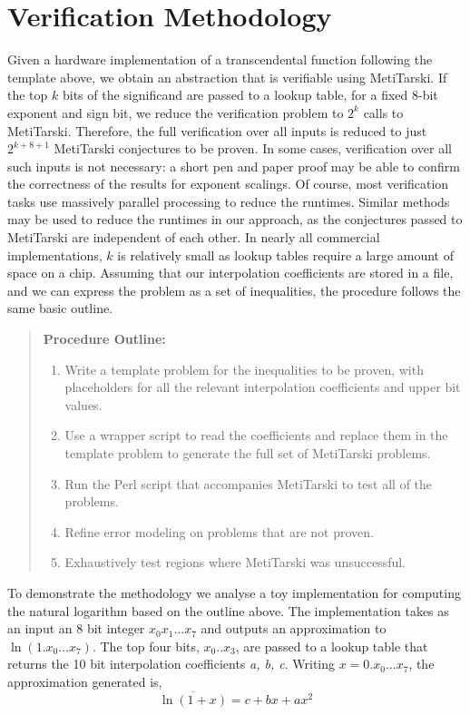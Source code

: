 \documentclass[a4]{article}
\begin{document}
\section{Verification Methodology}
Given a hardware implementation of a transcendental function following the template above, we obtain an abstraction that is verifiable using MetiTarski. If the top $k$ bits of the significand are passed to a lookup table, for a fixed 8-bit exponent and sign bit, we reduce the verification problem to $2^k$ calls to MetiTarski. Therefore, the  full verification over all inputs is reduced to 
just $2^{k+8+1}$ MetiTarski conjectures to be proven. In some cases, verification over all such inputs is not necessary: a short pen and paper proof may be able to confirm the correctness of the results for exponent scalings. Of course, most verification tasks use massively parallel processing to reduce the runtimes. Similar methods may be used to reduce the runtimes in our approach, as the conjectures passed to MetiTarski are independent of each other. In nearly all commercial implementations, $k$ is relatively small as lookup tables require a large amount of space on a chip. Assuming that our interpolation coefficients are stored in a file, and we can express the problem as a set of inequalities, the procedure follows the same basic outline.


\begin{quotation}
\textbf{Procedure Outline:}
\begin{enumerate}
\item Write a template problem for the inequalities to be proven, with placeholders for all the relevant interpolation coefficients and upper bit values.
\item Use a wrapper script to read the coefficients and replace them in the template problem to generate the full set of MetiTarski problems.
\item Run the Perl script that accompanies MetiTarski to test all of the problems.
\item Refine error modeling on problems that are not proven.
\item Exhaustively test regions where MetiTarski was unsuccessful.
\end{enumerate}  
\end{quotation}

To demonstrate the methodology we analyse a toy implementation for computing the natural logarithm based on the outline above. The implementation takes as an input an 8 bit integer $x_0x_1...x_7$ and outputs an approximation to $\ln(1.x_0...x_7)$. The top four bits, $x_0..x_3$, are passed to a lookup table that returns the 10 bit interpolation coefficients \textit{a, b, c}. Writing $x=0.x_0...x_7$, the approximation generated is,
$$ \overline{\ln(1+x)}=c + bx +ax^2 $$
\end{document}
